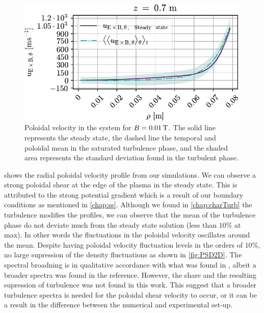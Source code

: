 %
\begin{figure}[htbp]
    \centering
    \includegraphics{fig/results/poloidalFlow/poloidalFlow01}
    \caption{Poloidal velocity in the system for $B=0.01\, \text{T}$.
    The solid line represents the steady state, the dashed line the temporal and poloidal mean in the saturated turbulence phase, and the shaded area represents the standard deviation found in the turbulent phase.}
    \label{fig:poloidalFlow0008}
\end{figure}
%
 shows the radial poloidal velocity profile from our simulations.
We can observe a strong poloidal shear at the edge of the plasma in the steady state.
This is attributed to the strong potential gradient which is a result of our boundary conditions as mentioned in \cref{chap:ss}.
Although we found in \cref{chap:charTurb} the turbulence modifies the profiles, we can observe that the mean of the turbulence phase do not deviate much from the steady state solution (less than $10\%$ at max).
In other words the fluctuations in the poloidal velocity oscillates around the mean.
Despite having poloidal velocity fluctuation levels in the orders of $10\%$, no large supression of the density fluctuations as shown in \cref{fig:PSD2D}.
The spectral broadning is in qualitative accordance with what was found in \cite{Tynan2006a}, albeit a broader spectra was found in the reference.
However, the share and the resulting supression of turbulence was not found in this work.
This suggest that a broader turbulence spectra is needed for the poloidal shear velocity to occur, or it can be a result in the difference between the numerical and experimental set-up.
%

